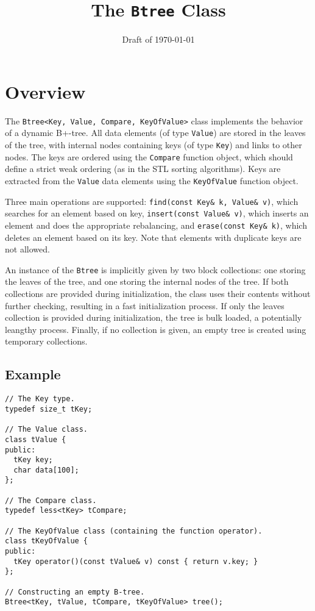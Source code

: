 \documentclass[11pt]{article}
\begin{document}
\title{\bf The {\tt Btree} Class}
\date{Draft of \today}
\author{}
\maketitle

\section{Overview}
\label{btree:overview}

The {\tt Btree<Key, Value, Compare, KeyOfValue>} class implements the behavior of a dynamic B+-tree. All data elements (of type {\tt Value}) are stored in the leaves of the tree, with internal nodes containing keys (of type {\tt Key}) and links to other nodes. The keys are ordered using the {\tt Compare} function object, which should define a strict weak ordering (as in the STL sorting algorithms). Keys are extracted from the {\tt Value} data elements using the {\tt KeyOfValue} function object.

Three main operations are supported: {\tt find(const Key\& k, Value\&
v)}, which searches for an element based on key, {\tt insert(const
Value\& v)}, which inserts an element and does the appropriate
rebalancing, and {\tt erase(const Key\& k)}, which deletes an element
based on its key. Note that elements with duplicate keys are not allowed.

An instance of the {\tt Btree} is implicitly given by two block
collections: one storing the leaves of the tree, and one storing the
internal nodes of the tree. If both collections are provided during
initialization, the class uses their contents without further
checking, resulting in a fast initialization process. If only the
leaves collection is provided during initialization, the tree is bulk
loaded, a potentially leangthy process. Finally, if no collection is
given, an empty tree is created using temporary collections.

\subsection{Example}
\begin{verbatim}
// The Key type.
typedef size_t tKey;

// The Value class.
class tValue {
public:
  tKey key;
  char data[100];
};

// The Compare class.
typedef less<tKey> tCompare;

// The KeyOfValue class (containing the function operator).
class tKeyOfValue {
public:
  tKey operator()(const tValue& v) const { return v.key; }
};

// Constructing an empty B-tree.
Btree<tKey, tValue, tCompare, tKeyOfValue> tree();
\end{verbatim}
\end{document}
